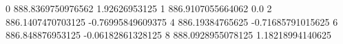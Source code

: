 0 888.8369750976562 1.92626953125
1 886.9107055664062 0.0
2 886.1407470703125 -0.76995849609375
4 886.19384765625 -0.71685791015625
6 886.848876953125 -0.06182861328125
8 888.0928955078125 1.18218994140625

